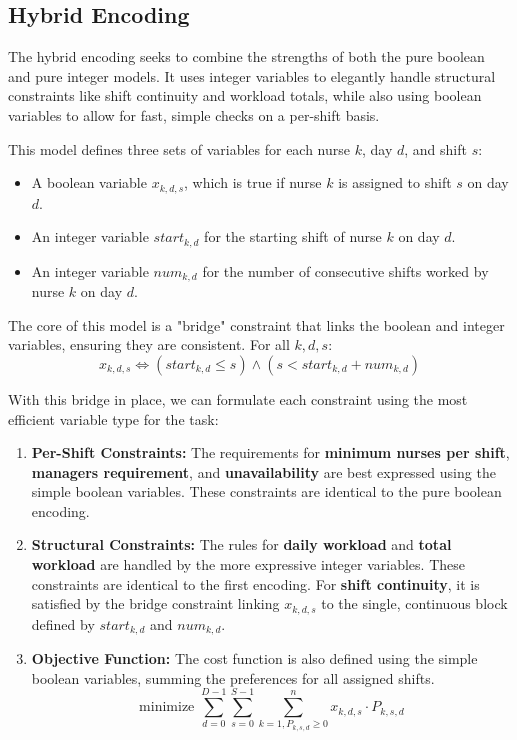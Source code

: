 \documentclass[sigconf, 10pt]{acmart}
\begin{document}
\subsection{Hybrid Encoding}

The hybrid encoding seeks to combine the strengths of both the pure boolean and pure integer models. It uses integer variables to elegantly handle structural constraints like shift continuity and workload totals, while also using boolean variables to allow for fast, simple checks on a per-shift basis.

This model defines three sets of variables for each nurse $k$, day $d$, and shift $s$:
\begin{itemize}
    \item A boolean variable $x_{k,d,s}$, which is true if nurse $k$ is assigned to shift $s$ on day $d$.
    \item An integer variable $start_{k,d}$ for the starting shift of nurse $k$ on day $d$.
    \item An integer variable $num_{k,d}$ for the number of consecutive shifts worked by nurse $k$ on day $d$.
\end{itemize}

The core of this model is a "bridge" constraint that links the boolean and integer variables, ensuring they are consistent. For all $k, d, s$:
\begin{equation}
    x_{k,d,s} \iff (start_{k,d} \le s) \land (s < start_{k,d} + num_{k,d})
\end{equation}

With this bridge in place, we can formulate each constraint using the most efficient variable type for the task:

\begin{enumerate}
    \item \textbf{Per-Shift Constraints:} The requirements for \textbf{minimum nurses per shift}, \textbf{managers requirement}, and \textbf{unavailability} are best expressed using the simple boolean variables. These constraints are identical to the pure boolean encoding.
    
    \item \textbf{Structural Constraints:} The rules for \textbf{daily workload} and \textbf{total workload} are handled by the more expressive integer variables. These constraints are identical to the first encoding. For \textbf{shift continuity}, it is satisfied by the bridge constraint linking $x_{k,d,s}$ to the single, continuous block defined by $start_{k,d}$ and $num_{k,d}$.
    
    \item \textbf{Objective Function:} The cost function is also defined using the simple boolean variables, summing the preferences for all assigned shifts.
    \begin{equation}
        \text{minimize } \sum_{d=0}^{D-1} \sum_{s=0}^{S-1} \sum_{k=1, P_{k,s,d} \ge 0}^{n} x_{k,d,s} \cdot P_{k,s,d}
    \end{equation}
\end{enumerate}
\end{document}
